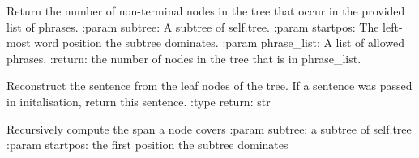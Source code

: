 \documentclass[letterpaper,10pt,english]{sphinxmanual}
\begin{document}
\begin{fulllineitems}
\begin{fulllineitems}
\end{fulllineitems}


\begin{fulllineitems}
\label{constituencies:constituencies.ConstituencyTree.phrases_consistent}
Return the number of non-terminal nodes in the tree
that occur in the provided list of phrases.
:param subtree:         A subtree of self.tree.
:param startpos:        The left-most word position the subtree dominates.
:param phrase\_list:     A list of allowed phrases.
:return:        the number of nodes in the tree that is in phrase\_list.

\end{fulllineitems}


\begin{fulllineitems}
\label{constituencies:constituencies.ConstituencyTree.reconstruct_sentence}
Reconstruct the sentence from the leaf nodes of the
tree. If a sentence was passed in initalisation, return
this sentence.
:type return:   str

\end{fulllineitems}


\begin{fulllineitems}
\label{constituencies:constituencies.ConstituencyTree.root_span}
Recursively compute the span a node covers
:param subtree:         a subtree of self.tree
:param startpos:        the first position the subtree dominates

\end{fulllineitems}


\end{fulllineitems}


\begin{fulllineitems}
\label{constituencies:constituencies.demo}
\end{fulllineitems}
\end{document}
